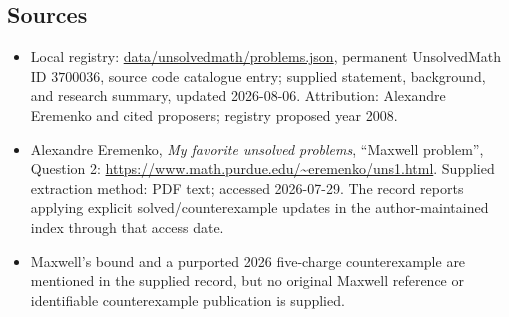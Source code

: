 \documentclass[11pt]{article}
\begin{document}
\subsection{Sources}
\begin{itemize}
\item Local registry: \url{data/unsolvedmath/problems.json}, permanent UnsolvedMath ID \(3700036\), source code catalogue entry; supplied statement, background, and research summary, updated 2026-08-06. Attribution: Alexandre Eremenko and cited proposers; registry proposed year 2008.
\item Alexandre Eremenko, \emph{My favorite unsolved problems}, ``Maxwell problem'', Question 2: \url{https://www.math.purdue.edu/~eremenko/uns1.html}. Supplied extraction method: PDF text; accessed 2026-07-29. The record reports applying explicit solved/counterexample updates in the author-maintained index through that access date.
\item Maxwell's bound and a purported 2026 five-charge counterexample are mentioned in the supplied record, but no original Maxwell reference or identifiable counterexample publication is supplied.
\end{itemize}
\end{document}

